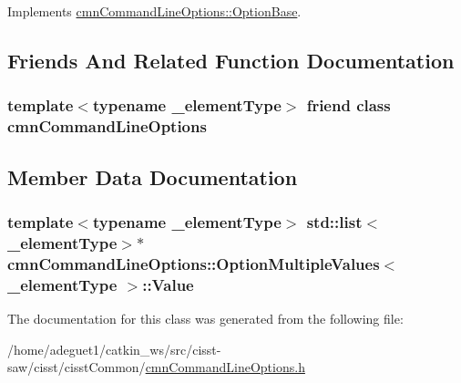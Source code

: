 Implements \hyperlink{classcmn_command_line_options_1_1_option_base_a738dbf56caefe3ee0f5eb9c3cc33bdd6}{cmn\-Command\-Line\-Options\-::\-Option\-Base}.



\subsection{Friends And Related Function Documentation}
\hypertarget{classcmn_command_line_options_1_1_option_multiple_values_a18923f23ed3914806f1edf878a64b422}{
\subsubsection[{cmn\-Command\-Line\-Options}]{\setlength{\rightskip}{0pt plus 5cm}template$<$typename \-\_\-element\-Type$>$ friend class {\bf cmn\-Command\-Line\-Options}\hspace{0.3cm}{\ttfamily [friend]}}}\label{classcmn_command_line_options_1_1_option_multiple_values_a18923f23ed3914806f1edf878a64b422}


\subsection{Member Data Documentation}
\hypertarget{classcmn_command_line_options_1_1_option_multiple_values_adde8989719b8006a0c8569cd9480a945}{
\subsubsection[{Value}]{\setlength{\rightskip}{0pt plus 5cm}template$<$typename \-\_\-element\-Type$>$ std\-::list$<$\-\_\-element\-Type$>$$\ast$ {\bf cmn\-Command\-Line\-Options\-::\-Option\-Multiple\-Values}$<$ \-\_\-element\-Type $>$\-::Value\hspace{0.3cm}{\ttfamily [protected]}}}\label{classcmn_command_line_options_1_1_option_multiple_values_adde8989719b8006a0c8569cd9480a945}


The documentation for this class was generated from the following file\-:\begin{DoxyCompactItemize}
\item 
/home/adeguet1/catkin\-\_\-ws/src/cisst-\/saw/cisst/cisst\-Common/\hyperlink{cmn_command_line_options_8h}{cmn\-Command\-Line\-Options.\-h}\end{DoxyCompactItemize}

